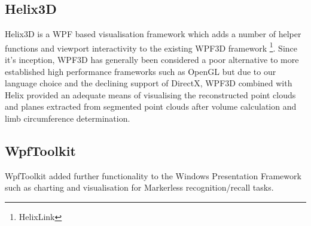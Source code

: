 \subsection{Helix3D}
Helix3D is a WPF based visualisation framework which adds a number of helper functions and viewport interactivity to the existing WPF3D framework \footnote{HelixLink}. Since it's inception, WPF3D has generally been considered a poor alternative to more established high performance frameworks such as OpenGL \cite{WpfPoor} but due to our language choice and the declining support of DirectX, WPF3D combined with Helix provided an adequate means of visualising the reconstructed point clouds and planes extracted from segmented point clouds after volume calculation and limb circumference determination. \\  

\subsection{WpfToolkit}
\label{design:wpf}

WpfToolkit added further functionality to the Windows Presentation Framework such as charting and visualisation for Markerless recognition/recall tasks. \\
